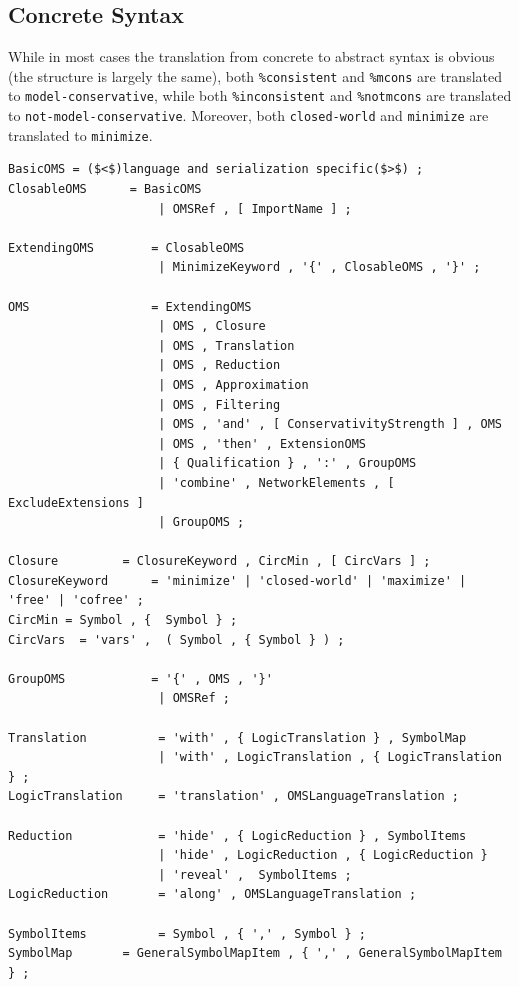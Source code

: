\documentclass[10pt,fleqn,final]{scrreprt}
\newcommand*{\syntax}[1]{\texttt{#1}}
\newcommand{\ssclause}[1]{\subsection{#1}}
\newenvironment{definitions}[0]{\medskip }{}
\begin{document}
\begin{definitions}
\ssclause{Concrete Syntax} \label{a:dol-text:OMS}


While in most cases the translation from concrete to abstract syntax
is obvious (the structure is largely the same),  both
\syntax{\%consistent} and \syntax{\%mcons} are translated to
\syntax{model-conservative}, while both \syntax{\%inconsistent} and
\syntax{\%notmcons} are translated to
\syntax{not-model-conservative}. Moreover, both \syntax{closed-world}
and \syntax{minimize} are translated to \syntax{minimize}.

                       
\begin{lstlisting}[language=ebnf,escapeinside={()},mathescape]
BasicOMS = ($<$)language and serialization specific($>$) ;
ClosableOMS      = BasicOMS
                     | OMSRef , [ ImportName ] ; 
                     
ExtendingOMS        = ClosableOMS
                     | MinimizeKeyword , '{' , ClosableOMS , '}' ;
                     
OMS                 = ExtendingOMS
                     | OMS , Closure 
                     | OMS , Translation
                     | OMS , Reduction
                     | OMS , Approximation
                     | OMS , Filtering
                     | OMS , 'and' , [ ConservativityStrength ] , OMS 
                     | OMS , 'then' , ExtensionOMS
                     | { Qualification } , ':' , GroupOMS
                     | 'combine' , NetworkElements , [ ExcludeExtensions ]  
                     | GroupOMS ;

Closure         = ClosureKeyword , CircMin , [ CircVars ] ;
ClosureKeyword      = 'minimize' | 'closed-world' | 'maximize' | 'free' | 'cofree' ;
CircMin = Symbol , {  Symbol } ;
CircVars  = 'vars' ,  ( Symbol , { Symbol } ) ;

GroupOMS            = '{' , OMS , '}'
                     | OMSRef ;

Translation          = 'with' , { LogicTranslation } , SymbolMap
                     | 'with' , LogicTranslation , { LogicTranslation } ;
LogicTranslation     = 'translation' , OMSLanguageTranslation ;
                      
Reduction            = 'hide' , { LogicReduction } , SymbolItems 
                     | 'hide' , LogicReduction , { LogicReduction } 
                     | 'reveal' ,  SymbolItems ;
LogicReduction       = 'along' , OMSLanguageTranslation ;

SymbolItems          = Symbol , { ',' , Symbol } ;
SymbolMap       = GeneralSymbolMapItem , { ',' , GeneralSymbolMapItem } ;


\end{lstlisting}
\end{definitions}
\end{document}
